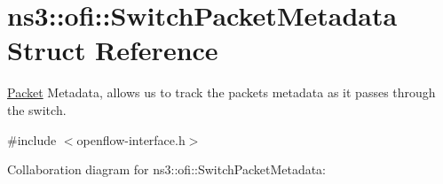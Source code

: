 \hypertarget{structns3_1_1ofi_1_1SwitchPacketMetadata}{}\section{ns3\+:\+:ofi\+:\+:Switch\+Packet\+Metadata Struct Reference}
\label{structns3_1_1ofi_1_1SwitchPacketMetadata}


\hyperlink{classns3_1_1Packet}{Packet} Metadata, allows us to track the packet\textquotesingle{}s metadata as it passes through the switch.  




{\ttfamily \#include $<$openflow-\/interface.\+h$>$}



Collaboration diagram for ns3\+:\+:ofi\+:\+:Switch\+Packet\+Metadata\+:
